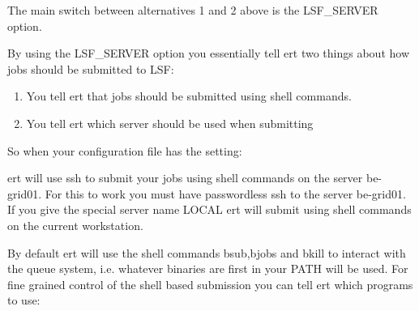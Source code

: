 \documentclass[letterpaper,10pt,english]{sphinxmanual}
\begin{document}
The main switch between alternatives 1 and 2 above is the LSF\_SERVER option.

\label{\detokenize{keywords/index:lsf-server}}
\begin{sphinxShadowBox}

By using the LSF\_SERVER option you essentially tell ert two things about how
jobs should be submitted to LSF:
\begin{enumerate}
\item {} 
You tell ert that jobs should be submitted using shell commands.

\item {} 
You tell ert which server should be used when submitting

\end{enumerate}

So when your configuration file has the setting:

%
\begin{sphinxVerbatim}[commandchars=\\\{\}]
   
\end{sphinxVerbatim}

ert will use ssh to submit your jobs using shell commands on the server
be-grid01. For this to work you must have passwordless ssh to the server
be-grid01. If you give the special server name LOCAL ert will submit using
shell commands on the current workstation.


By default ert will use the shell commands bsub,bjobs and bkill to interact
with the queue system, i.e. whatever binaries are first in your PATH will be
used. For fine grained control of the shell based submission you can tell ert
which programs to use:

%
\begin{sphinxVerbatim}[commandchars=\\\{\}]
       
        
\end{sphinxVerbatim}



\end{sphinxShadowBox}
\end{document}

